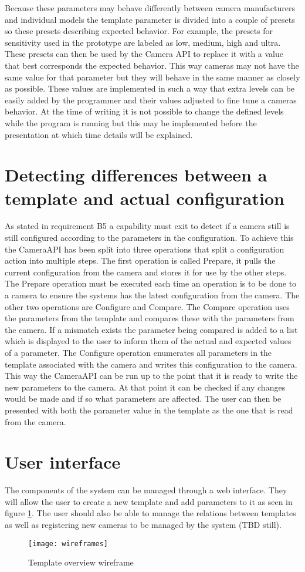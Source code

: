 Because these parameters may behave differently between camera manufacturers and individual models the template parameter is divided into a couple of presets so these presets describing expected behavior.
For example, the presets for sensitivity used in the prototype are labeled as low, medium, high and ultra.
These presets can then be used by the Camera API to replace it with a value that best corresponds the expected behavior.
This way cameras may not have the same value for that parameter but they will behave in the same manner as closely as possible.
These values are implemented in such a way that extra levels can be easily added by the programmer and their values adjusted to fine tune a cameras behavior.
At the time of writing it is not possible to change the defined levels while the program is running but this may be implemented before the presentation at which time details will be explained.

\section{Detecting differences between a template and actual configuration}
As stated in requirement B5 a capability must exit to detect if a camera still is still configured according to the parameters in the configuration.
To achieve this the CameraAPI has been split into three operations that split a configuration action into multiple steps.
The first operation is called Prepare, it pulls the current configuration from the camera and stores it for use by the other steps.
The Prepare operation must be executed each time an operation is to be done to a camera to ensure the systems has the latest configuration from the camera.
The other two operations are Configure and Compare.
The Compare operation uses the parameters from the template and compares these with the parameters from the camera.
If a mismatch exists the parameter being compared is added to a list which is displayed to the user to inform them of the actual and expected values of a parameter.
The Configure operation enumerates all parameters in the template associated with the camera and writes this configuration to the camera.
This way the CameraAPI can be run up to the point that it is ready to write the new parameters to the camera.
At that point it can be checked if any changes would be made and if so what parameters are affected.
The user can then be presented with both the parameter value in the template as the one that is read from the camera.

\section{User interface}
The components of the system can be managed through a web interface.
They will allow the user to create a new template and add parameters to it as seen in figure \ref{fig:templatewireframe}.
The user should also be able to manage the relations between templates as well as registering new cameras to be managed by the system (TBD still).
\begin{figure}[h!]
	\centering
	\texttt{[image: wireframes]}
	\caption{Template overview  wireframe}
	\label{fig:templatewireframe}
\end{figure}
